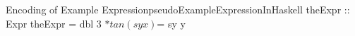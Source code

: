 \begin{pseudohaskell}{Encoding of Example Expression}{pseudoExampleExpressionInHaskell}
theExpr :: Expr
theExpr = dbl 3 $* tan (sy x) $= sy y
\end{pseudohaskell}
